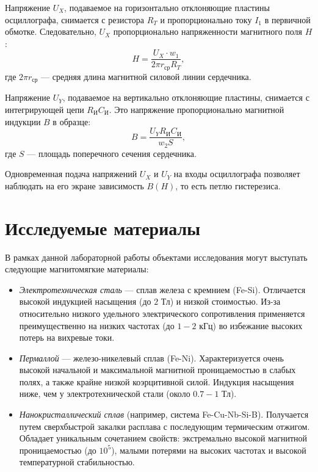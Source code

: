 Напряжение $U_X$, подаваемое на горизонтально отклоняющие пластины осциллографа, снимается с резистора $R_T$ и пропорционально току $I_1$ в первичной обмотке. Следовательно, $U_X$ пропорционально напряженности магнитного поля $H$:
\begin{equation}
	H = \frac{U_X \cdot w_1}{2\pi r_{ср} R_T},
	\label{eq:H_field}
\end{equation}
где $2\pi r_{ср}$ — средняя длина магнитной силовой линии сердечника.

Напряжение $U_Y$, подаваемое на вертикально отклоняющие пластины, снимается с интегрирующей цепи $R_И C_И$. Это напряжение пропорционально магнитной индукции $B$ в образце:
\begin{equation}
	B = \frac{U_Y R_И C_И}{w_2 S},
	\label{eq:B_induction}
\end{equation}
где $S$ — площадь поперечного сечения сердечника.

Одновременная подача напряжений $U_X$ и $U_Y$ на входы осциллографа позволяет наблюдать на его экране зависимость $B(H)$, то есть петлю гистерезиса.

\section*{Исследуемые материалы}
В рамках данной лабораторной работы объектами исследования могут выступать следующие магнитомягкие материалы:
\begin{itemize}
    \item \textit{Электротехническая сталь} — сплав железа с кремнием (Fe-Si). Отличается высокой индукцией насыщения (до $2$ Тл) и низкой стоимостью. Из-за относительно низкого удельного электрического сопротивления применяется преимущественно на низких частотах (до $1-2$ кГц) во избежание высоких потерь на вихревые токи.
    \item \textit{Пермаллой} — железо-никелевый сплав (Fe-Ni). Характеризуется очень высокой начальной и максимальной магнитной проницаемостью в слабых полях, а также крайне низкой коэрцитивной силой. Индукция насыщения ниже, чем у электротехнической стали (около $0.7-1$ Тл).
    \item \textit{Нанокристаллический сплав} (например, система Fe-Cu-Nb-Si-B). Получается путем сверхбыстрой закалки расплава с последующим термическим отжигом. Обладает уникальным сочетанием свойств: экстремально высокой магнитной проницаемостью (до $10^5$), малыми потерями на высоких частотах и высокой температурной стабильностью.
\end{itemize}


